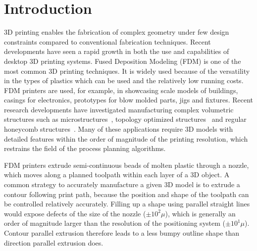 \section{Introduction}
3D printing enables the fabrication of complex geometry under few design constraints compared to conventional fabrication techniques.
Recent developments have seen a rapid growth in both the use and capabilities of desktop 3D printing systems.
Fused Deposition Modeling (FDM) is one of the most common 3D printing techniques.
It is widely used because of the versatility in the types of plastics which can be used and the relatively low running costs.
FDM printers are used, for example, in showcasing scale models of buildings, casings for electronics, prototypes for blow molded parts, jigs and fixtures.
Recent research developments have investigated manufacturing complex volumetric structures such as microstructures~\cite{bates2018compressive,Liu2019a}, topology optimized structures~\cite{Zong2019,Wu2019a,Cheng2019} and regular honeycomb structures~\cite{Al-Ketan2018,Maskery2018}.
Many of these applications require 3D models with detailed features within the order of magnitude of the printing resolution, which restrains the field of the process planning algorithms.

FDM printers extrude semi-continuous beads of molten plastic through a nozzle, which moves along a planned toolpath within each layer of a 3D object.
A common strategy to accurately manufacture a given 3D model is to extrude a contour following print path,
because the position and shape of the toolpath can be controlled relatively accurately.
Filling up a shape using parallel straight lines would expose defects of the size of the nozzle ($\pm 10^2 \mu$), which is generally an order of magnitude larger than the resolution of the positioning system ($\pm 10^1 \mu$).
Contour parallel extrusion therefore leads to a less bumpy outline shape than direction parallel extrusion does.


